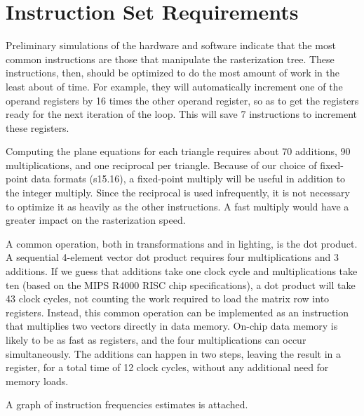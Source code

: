 \documentclass{article}
\begin{document}
\section{Instruction Set Requirements}

Preliminary simulations of the hardware and software indicate that the
most common instructions are those that manipulate the rasterization
tree.  These instructions, then, should be optimized to do the most
amount of work in the least about of time.  For example, they will
automatically increment one of the operand registers by 16 times the
other operand register, so as to get the registers ready for the next
iteration of the loop.  This will save 7 instructions to increment
these registers.

Computing the plane equations for each triangle requires about 70
additions, 90 multiplications, and one reciprocal per triangle. 
Because of our choice of fixed-point data formats (s15.16), a
fixed-point multiply will be useful in addition to the integer
multiply.  Since the reciprocal is used infrequently,
it is not necessary to optimize it as heavily
as the other instructions.  A fast multiply would have a greater
impact on the rasterization speed.

A common operation, both in transformations and in lighting, is the
dot product.  A sequential 4-element vector dot product requires four
multiplications and 3 additions.  If we guess that additions take one
clock cycle and multiplications take ten (based on the MIPS R4000 RISC chip
specifications), a dot product will take 43 clock cycles, not counting
the work required to load the matrix row into registers.  Instead,
this common operation can be implemented as an instruction that
multiplies two vectors directly in data memory.  On-chip data memory
is likely to be as fast as registers, and the four multiplications can
occur simultaneously.  The additions can happen in two steps, leaving
the result in a register, for a total time of 12 clock cycles, without
any additional need for memory loads.

A graph of instruction frequencies estimates is attached.
\end{document}
